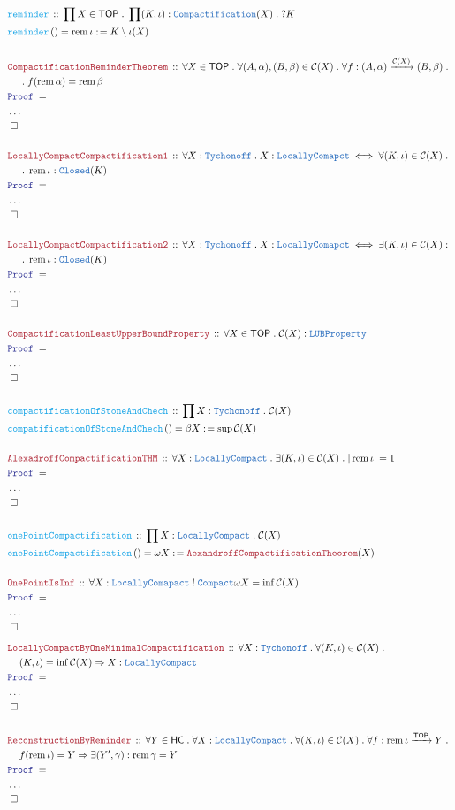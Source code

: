 \documentclass[12pt]{scrartcl}
\newcommand{\TYPE}[1]{\textcolor{NavyBlue}{\mathtt{#1}}}
\newcommand{\FUNC}[1]{\textcolor{Cerulean}{\mathtt{#1}}}
\newcommand{\LOGIC}[1]{\textcolor{Blue}{\mathtt{#1}}}
\newcommand{\THM}[1]{\textcolor{Maroon}{\mathtt{#1}}}
\renewcommand{\.}{\; . \;}
\newcommand{\de}{: \kern 0.1pc =}
\newcommand{\IsNot}{\; ! \;}
\newcommand{\Act}[1]{\left( #1 \right)}
\newcommand{\Theorem}[2]{& \THM{#1} \, :: \, #2 \\ & \Proof = \\ }
\newcommand{\DeclareFunc}[2]{& \FUNC{#1} \, :: \, #2 \\}
\newcommand{\DefineNamedFunc}[4]{&  \FUNC{#1}\Act{#2} = #3 \de #4 \\}
\newcommand{\NewLine}{\\ & \kern 1pc}
\newcommand{\Page}[1]{ \begin{align*} #1 \end{align*}   }
\newcommand{\NoProof}{ & \ldots \\ \EndProof}
\newcommand{\Imply}{\Rightarrow}
\newcommand{\Arrow}{\xrightarrow}
\newcommand{\QED}{\; \square}
\newcommand{\EndProof}{& \QED \\}
\newcommand{\Proof}{\LOGIC{Proof} \; }
\newcommand{\C}{\mathcal{C}}
\DeclareMathOperator{\rem}{rem}
\newcommand{\TOP}{\mathsf{TOP}}
\newcommand{\HC}{\mathsf{HC}}
\begin{document}
\Page{
	\DeclareFunc{reminder}{ \prod X \in \TOP \. \prod (K,\iota) : \TYPE{Compactification}(X) \. ?K  }
	\DefineNamedFunc{reminder}{}{\rem \iota}{K \setminus  \iota(X)}
	\\
	\Theorem{CompactificationReminderTheorem}
	{
		\forall X \in \TOP \. 
		\forall (A,\alpha),(B,\beta) \in \C(X) \.
		\forall f : (A,\alpha) \Arrow{\C(X)} (B,\beta) \. \NewLine \. 
		f(\rem \alpha) = \rem \beta
	}
	\NoProof
	\\
	\Theorem{LocallyCompactCompactification1}
	{
		\forall X : \TYPE{Tychonoff} \.
		X : \TYPE{LocallyComapct} \iff
		\forall (K, \iota) \in \C(X) \.
		\NewLine \.
		\rem \iota : \TYPE{Closed}(K)
	}
	\NoProof
	\\
	\Theorem{LocallyCompactCompactification2}
	{
		\forall X : \TYPE{Tychonoff} \.
		X : \TYPE{LocallyComapct} \iff
		\exists (K, \iota) \in \C(X) :
		\NewLine \.
		\rem \iota : \TYPE{Closed}(K)
	}
	\NoProof
	\\
	\Theorem{CompactificationLeastUpperBoundProperty}
	{
		\forall X \in \TOP \. \C(X) : \TYPE{LUBProperty}
	}
	\NoProof
	\\
	\DeclareFunc{compactificationOfStoneAndChech}
	{
		\prod  X : \TYPE{Tychonoff}  \. \C(X)
	}
	\DefineNamedFunc{compatificationOfStoneAndChech}{}{\beta X}{\sup \C(X)}
	\\
	\Theorem{AlexadroffCompactificationTHM}
	{
		\forall X : \TYPE{LocallyCompact} \.
		\exists (K, \iota) \in \C(X) \. 
		| \rem \iota | = 1
	}
	\NoProof
	\\
	\DeclareFunc{onePointCompactification}
	{
		\prod  X : \TYPE{LocallyCompact}  \. \C(X)
	}
	\DefineNamedFunc{onePointCompactification}{}{\omega X}{\THM{AexandroffCompactificationTheorem}(X)}
	\\
	\Theorem{OnePointIsInf}
	{
		\forall X : \TYPE{LocallyComapact} \IsNot \TYPE{Compact} \/
		\omega X = \inf \C(X)
	}
	\NoProof
}
\Page{
	\Theorem{LocallyCompactByOneMinimalCompactification}
	{
		\forall X : \TYPE{Tychonoff} \.
		\forall (K,\iota) \in \C(X) \. \NewLine 
		(K,\iota) = \inf \C(X) \Imply X : \TYPE{LocallyCompact}
	}
	\NoProof
	\\
	\Theorem{ReconstructionByReminder}
	{
		\forall Y \in \HC \.
		\forall X : \TYPE{LocallyCompact} \.
		\forall (K,\iota) \in \C(X) \.
		\forall f : \rem \iota \Arrow{\TOP} Y \. \NewLine  
		f(\rem \iota) = Y \Imply \exists (Y', \gamma ) : 
		\rem \gamma = Y
	}
	\NoProof
}
\newpage
\end{document}
